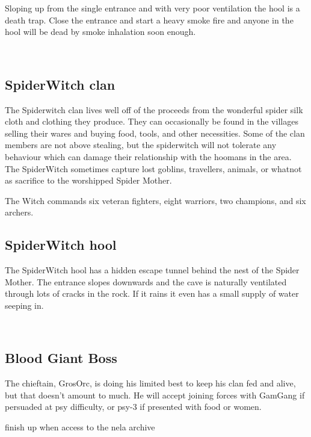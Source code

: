 Sloping up from the single entrance and with very poor ventilation the hool is a death trap. Close the entrance and start a heavy smoke fire and anyone in the hool will be dead by smoke inhalation soon enough.

\


\subsection*{SpiderWitch clan}

The Spiderwitch clan lives well off of the proceeds from the wonderful spider silk cloth and clothing they produce. They can occasionally be found in the villages selling their wares and buying food, tools, and other necessities. Some of the clan members are not above stealing, but the spiderwitch will not tolerate any behaviour which can damage their relationship with the hoomans in the area. The SpiderWitch sometimes capture lost goblins, travellers, animals, or whatnot as sacrifice to the worshipped Spider Mother.

The Witch commands six veteran fighters, eight warriors, two champions, and six archers.


\subsection*{SpiderWitch hool}

The SpiderWitch hool has a hidden escape tunnel behind the nest of the Spider Mother. The entrance slopes downwards and the cave is naturally ventilated through lots of cracks in the rock. If it rains it even has a small supply of water seeping in. 

\


\goodbreak
\subsection*{Blood Giant Boss}

The chieftain, GrosOrc, is doing his limited best to keep his clan fed and alive, but that doesn't amount to much. He will accept joining forces with GamGang if persuaded at psy difficulty, or psy-3 if presented with food or women.

\todo finish up when access to the nela archive

\


